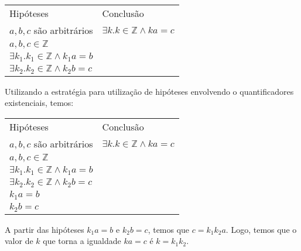 \begin{Example}
\begin{flushleft}
\begin{tabular}{ll}
Hipóteses & Conclusão \\
$a,b,c$ são arbitrários& $\exists k. k\in\mathbb{Z}\land ka = c$\\
$a,b,c\in\mathbb{Z}$ & \\
$\exists k_1. k_1\in\mathbb{Z}\land k_1a = b$ & \\
$\exists k_2. k_2\in\mathbb{Z}\land k_2b = c$ & \\
\end{tabular}
\end{flushleft}
Utilizando a estratégia para utilização de hipóteses envolvendo o
quantificadores existenciais, temos:
\begin{flushleft}
\begin{tabular}{ll}
Hipóteses & Conclusão \\
$a,b,c$ são arbitrários& $\exists k. k\in\mathbb{Z}\land ka = c$\\
$a,b,c\in\mathbb{Z}$ & \\
$\exists k_1. k_1\in\mathbb{Z}\land k_1a = b$ & \\
$\exists k_2. k_2\in\mathbb{Z}\land k_2b = c$ & \\
$k_1a = b$ & \\
$k_2b = c$ & \\
\end{tabular}
\end{flushleft}
A partir das hipóteses $k_1a = b$ e $k_2b = c$, temos que $c =
k_1k_2a$. Logo, temos que o valor de $k$ que torna a igualdade $ka =
c$ é $k = k_1k_2$.


\end{Example}
